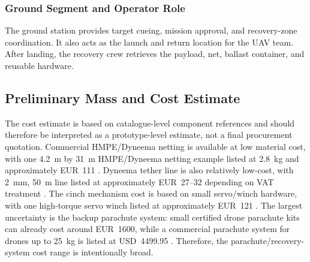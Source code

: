 \subsubsection{Ground Segment and Operator Role}

The ground station provides target cueing, mission approval, and recovery-zone coordination. It also acts as the launch and return location for the UAV team. After landing, the recovery crew retrieves the payload, net, ballast container, and reusable hardware.





\subsection{Preliminary Mass and Cost Estimate}





The cost estimate is based on catalogue-level component references and should therefore be interpreted as a prototype-level estimate, not a final procurement quotation. Commercial HMPE/Dyneema netting is available at low material cost, with one 4.2~m by 31~m HMPE/Dyneema netting example listed at 2.8~kg and approximately EUR~111 \cite{Netmark2026HMPE/DyneemaHM}. Dyneema tether line is also relatively low-cost, with 2~mm, 50~m line listed at approximately EUR~27--32 depending on VAT treatment \cite{Spearfishing.de2026DyneemaM}. The cinch mechanism cost is based on small servo/winch hardware, with one high-torque servo winch listed at approximately EUR~121 \cite{FlashRC2026ServoTurns}. The largest uncertainty is the backup parachute system: small certified drone parachute kits can already cost around EUR~1600, while a commercial parachute system for drones up to 25~kg is listed at USD~4499.95 \cite{MegaDron2026MOCSeries,UAVSystemsInternational2026DroneKg}. Therefore, the parachute/recovery-system cost range is intentionally broad.
\setlength{\tabcolsep}{3pt}

